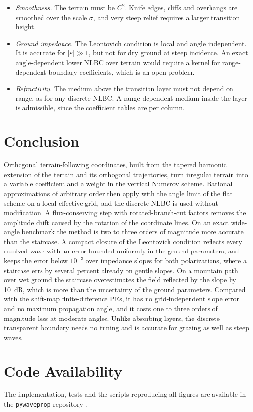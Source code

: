 \documentclass[journal]{IEEEtran}
\begin{document}
\begin{itemize}
aperture, in contrast, can be smaller than for the staircase: angles are
measured from the coordinate lines, which near the ground follow the slope.
There one slope instead of two suffices and makes the grid ten times smaller.
With both, the terrain-following run takes about half as long as the staircase
(\SI{7}{s} against \SI{15}{s} at $10^{-2}$).
\item \emph{Smoothness.} The terrain must be $C^2$. Knife edges, cliffs and
overhangs are smoothed over the scale $\sigma$, and very steep relief requires
a larger transition height.
\item \emph{Ground impedance.} The Leontovich condition is local and angle
independent. It is accurate for $|\varepsilon|\gg1$, but not for dry ground at
steep incidence. An exact angle-dependent lower NLBC \cite{lytaev2022radarconf}
over terrain would require a kernel for range-dependent boundary coefficients,
which is an open problem.
\item \emph{Refractivity.} The medium above the transition layer must not
depend on range, as for any discrete NLBC. A range-dependent medium inside the
layer is admissible, since the coefficient tables are per column.
\end{itemize}

\section{Conclusion}

Orthogonal terrain-following coordinates, built from the tapered harmonic
extension of the terrain and its orthogonal trajectories, turn irregular
terrain into a variable coefficient and a weight in the vertical Numerov scheme.
Rational approximations of arbitrary order then apply with the angle limit of
the flat scheme on a local effective grid, and the discrete NLBC is used without
modification. A flux-conserving step with rotated-branch-cut factors removes
the amplitude drift caused by the rotation of the coordinate lines. On an exact
wide-angle benchmark the method is two to three orders of magnitude more
accurate than the staircase. A compact closure of the Leontovich condition
reflects every resolved wave with an error bounded uniformly in the ground
parameters, and keeps the error below $10^{-3}$ over impedance slopes for
both polarizations, where a staircase errs by several percent already on
gentle slopes. On a mountain path over wet ground the staircase
overestimates the field reflected by the slope by \SI{10}{dB}, which is more
than the uncertainty of the ground parameters. Compared with the shift-map
finite-difference PEs, it has no grid-independent slope error and no maximum
propagation angle, and it costs one to three orders of magnitude less at
moderate angles. Unlike absorbing layers, the discrete transparent boundary
needs no tuning and is accurate for grazing as well as steep waves.

\section*{Code Availability}
The implementation, tests and the scripts reproducing all figures are
available in the \texttt{pywaveprop} repository \cite{pywaveprop}.



\end{document}
